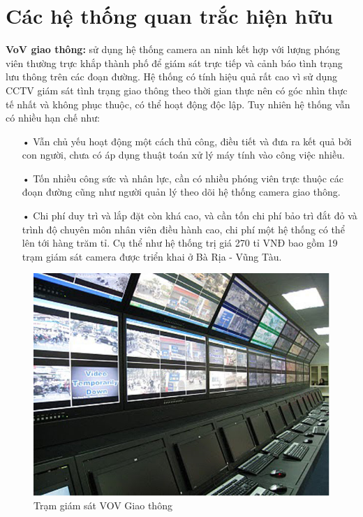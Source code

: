 \section{Các hệ thống quan trắc hiện hữu}
\textbf{VoV giao thông:}  sử dụng hệ thống camera an ninh kết hợp với lượng phóng viên thường trực khắp thành phố để giám sát trực tiếp và cảnh báo tình trạng lưu thông trên các đoạn đường. Hệ thống có tính hiệu quả rất cao vì sử dụng CCTV giám sát tình trạng giao thông theo thời gian thực nên có góc nhìn thực tế nhất và không phục thuộc, có thể hoạt động độc lập. Tuy nhiên hệ thống vẫn có nhiều hạn chế như:
\begin{itemize}
\item[•]Vẫn chủ yếu hoạt động một cách thủ công, điều tiết và đưa ra kết quả bởi con người, chưa có áp dụng thuật toán xử lý máy tính vào công việc nhiều.
\item[•]Tốn nhiều công sức và nhân lực, cần có nhiều phóng viên trực thuộc các đoạn đường cũng như người quản lý theo dõi hệ thống camera giao thông.
\item[•]Chi phí duy trì và lắp đặt còn khá cao, và cần tốn chi phí bảo trì đắt đỏ và trình độ chuyên môn nhân viên điều hành cao, chi phí một hệ thống có thể lên tới hàng trăm tỉ. Cụ thể như hệ thống trị giá 270 tỉ VNĐ bao gồm 19 trạm giám sát camera được triển khai ở Bà Rịa - Vũng Tàu.
\end{itemize}

\begin{figure}[htbp!] 
\centering    
\includegraphics[width=1.0\textwidth]{pic1}
\caption[Trạm giám sát VOV Giao thông ]{Trạm giám sát VOV Giao thông}
\label{fig:pic1}
\end{figure}





